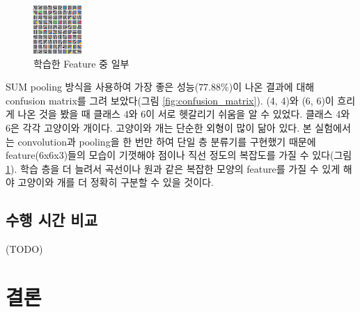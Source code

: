 \documentclass[a4paper,9pt]{article}
\begin{document}
\begin{multicols*}{2}
\begin{figure}[H]
\includegraphics[width=\linewidth]{feature}
\caption{학습한 Feature 중 일부}
\label{fig:feature}
\end{figure}

SUM pooling 방식을 사용하여 가장 좋은 성능($77.88$\%)이 나온 결과에 대해 confusion matrix를 그려 보았다(그림 \ref{fig:confusion_matrix}).
(4, 4)와 (6, 6)이 흐리게 나온 것을 봤을 때 클래스 4와 6이 서로 헷갈리기 쉬움을 알 수 있었다.
클래스 4와 6은 각각 고양이와 개이다.
고양이와 개는 단순한 외형이 많이 닮아 있다.
본 실험에서는 convolution과 pooling을 한 번만 하여 단일 층 분류기를 구현했기 때문에 feature(6x6x3)들의 모습이 기껏해야 점이나 직선 정도의 복잡도를 가질 수 있다(그림 \ref{fig:feature}).
학습 층을 더 늘려서 곡선이나 원과 같은 복잡한 모양의 feature를 가질 수 있게 해야 고양이와 개를 더 정확히 구분할 수 있을 것이다.

\subsection{수행 시간 비교}

(TODO)

\section{결론}


\end{multicols*}
\end{document}
